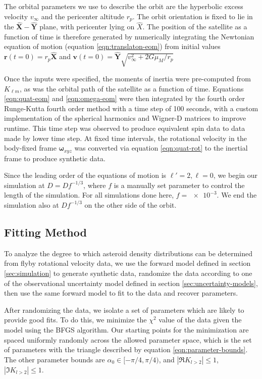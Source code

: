 \documentclass[11pt]{article}
\newcommand{\unit}[1]{\hat{\mathbf{#1}}}
\begin{document}
The orbital parameters we use to describe the orbit are the hyperbolic excess velocity $v_\infty$ and the pericenter altitude $r_p$. The orbit orientation is fixed to lie in the $\unit X-\unit Y$ plane, with pericenter lying on $\hat X$. The position of the satellite as a function of time is therefore generated by numerically integrating the Newtonian equation of motion (equation \ref{eqn:translaton-eom}) from initial values $\bm r(t=0) = r_p \unit X$ and $\bm v(t=0)=\unit Y \sqrt{v_\infty^2 + 2G\mu_M / r_p}$

Once the inputs were specified, the moments of inertia were pre-computed from $K_{\ell m}$, as was the orbital path of the satellite as a function of time. Equations \ref{eqn:quat-eom} and \ref{eqn:omega-eom} were then integrated by the fourth order Runge-Kutta fourth order method with a time step of 100 seconds, with a custom implementation of the spherical harmonics and Wigner-D matrices to improve runtime. This time step was observed to produce equivalent spin data to data made by lower time step. At fixed time intervals, the rotational velocity in the body-fixed frame $\bm\omega_{xyz}$ was converted via equation \ref{eqn:quat-rot} to the inertial frame to produce synthetic data.

Since the leading order of the equations of motion is $\ell' = 2, \ell = 0$, we begin our simulation at $D = D f^{-1/3}$, where $f$ is a manually set parameter to control the length of the simulation. For all simulations done here, $f = \SI{e-3}.$ We end the simulation also at $D f^{-1/3}$ on the other side of the orbit.



\subsection{Fitting Method}
To analyze the degree to which asteroid density distributions can be determined from flyby rotational velocity data, we use the forward model defined in section \ref{sec:simulation} to generate synthetic data, randomize the data according to one of the observational uncertainty model defined in section \ref{sec:uncertainty-models}, then use the same forward model to fit to the data and recover parameters.

After randomizing the data, we isolate a set of parameters which are likely to provide good fits. To do this, we minimize the $\chi^2$ value of the data given the model using the BFGS algorithm. Our starting points for the minimization are spaced uniformly randomly across the allowed parameter space, which is the set of parameters with the triangle described by equation \ref{eqn:parameter-bounds}. The other parameter bounds are $\alpha_0 \in [-\pi/4, \pi/4)$, and $|\Re K_{l>2}| \leq  1$, $|\Im K_{l>2}| \leq  1$.
\end{document}
